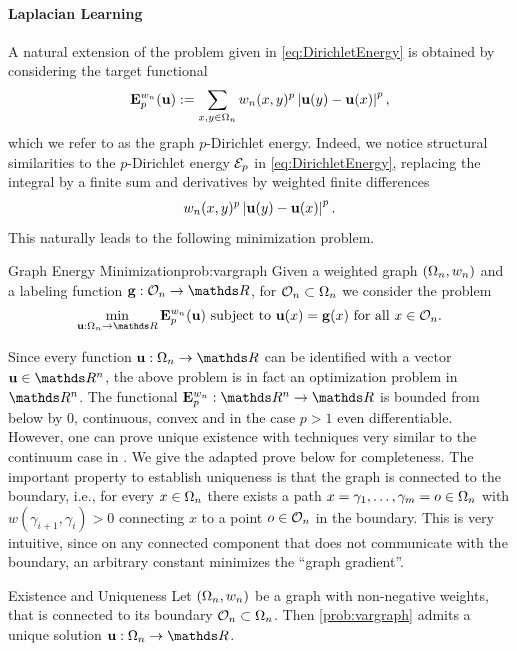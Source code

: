 \paragraph{Laplacian Learning} A natural extension of the problem given in \cref{eq:DirichletEnergy} is obtained by considering the target functional
%
\begin{align*}
	\mathbf{E}^{w_n}_p(\mathbf{u}):= \sum_{x,y\in\Omega_n} w_n(x,y)^p \left|\mathbf{u}(y) - \mathbf{u}(x)\right|^p,
\end{align*}
%
which we refer to as the graph $p$-Dirichlet energy. Indeed, we notice structural 
similarities to the $p$-Dirichlet energy $\mathcal{E}_p$ in \cref{eq:DirichletEnergy}, replacing the integral by a finite 
sum and derivatives by weighted finite differences
%
\begin{align*}
	w_n(x,y)^p \left|\mathbf{u}(y) - \mathbf{u}(x)\right|^p.
\end{align*}
%
This naturally leads to the following minimization problem.
%
\begin{problem}{Graph Energy Minimization}{prob:vargraph}
Given a weighted graph $(\Omega_n, w_n)$ and a labeling function $\vec g:\conset_n\to\R$, for $\mathcal{O}_n\subset\Omega_n$ we consider 
the problem
%
\begin{align*}
	\min_{\vec u:\domain_n\to\R} \GE^{w_n}_p(\vec u) \text{ subject to } \vec u(x) = \vec g(x) \text{ for all } x\in\conset_n.
\end{align*}
\end{problem}
%
\noindent%
Since every function $\vec u:\domain_n\to\R$ can be identified with a vector $\vec u\in\R^n$, the above problem 
is in fact an optimization problem in $\R^n$. The functional $\GE^{w_n}_p:\R^n\to\R$ is bounded from below by $0$, continuous, convex and in the case $p>1$ even differentiable. However, one can prove unique existence with techniques very similar to the continuum case in \cite{lindqvist2017notes}. We give the adapted prove below for completeness. The important property to establish uniqueness is that the graph is connected to the boundary, i.e., for every $x\in\Omega_n$ there exists a path $x=\gamma_1,\ldots,\gamma_m=o\in\Omega_n$ with $w(\gamma_{i+1}, \gamma_i)>0$ connecting $x$ to a point $o\in\mathcal{O}_n$ in the boundary. This is very intuitive, since on any connected component that does not communicate with the boundary, an arbitrary constant minimizes the \enquote{graph gradient}.
%
%
\begin{theorem}{Existence and Uniqueness}{} Let $(\Omega_n,w_n)$ be a graph with non-negative weights, that is connected to its boundary $\mathcal{O}_n\subset\Omega_n$. Then \cref{prob:vargraph} admits a unique solution $\vec u:\domain_n\to\R$.
\end{theorem}
